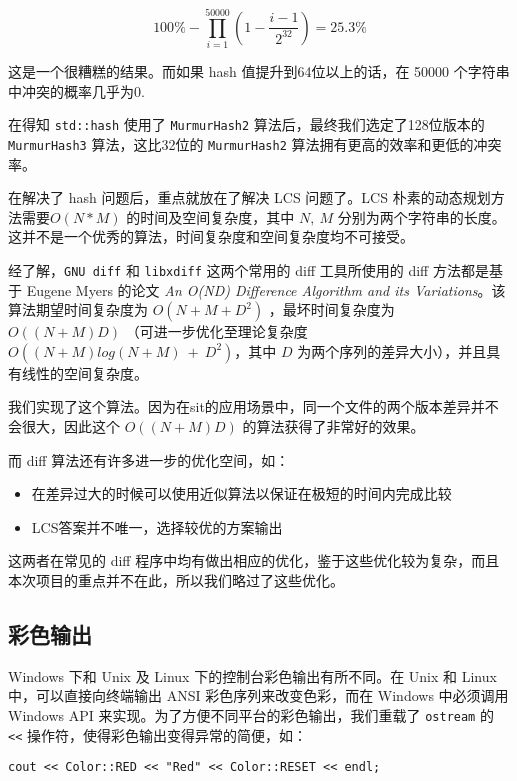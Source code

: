 \[
100\%-\prod _{i=1}^{50000} \left(1-\frac{i-1}{2^{32}}\right) = 25.3 \%
\]

这是一个很糟糕的结果。而如果 hash 值提升到64位以上的话，在 50000
个字符串中冲突的概率几乎为0.

在得知 \texttt{std::hash} 使用了 \texttt{MurmurHash2}
算法后，最终我们选定了128位版本的 \texttt{MurmurHash3} 算法，这比32位的
\texttt{MurmurHash2} 算法拥有更高的效率和更低的冲突率。

在解决了 hash 问题后，重点就放在了解决 LCS 问题了。LCS
朴素的动态规划方法需要$O(N*M)$ 的时间及空间复杂度，其中
$N,\ M$
分别为两个字符串的长度。这并不是一个优秀的算法，时间复杂度和空间复杂度均不可接受。

经了解，\texttt{GNU\ diff} 和 \texttt{libxdiff} 这两个常用的 diff
工具所使用的 diff 方法都是基于 Eugene Myers 的论文 \emph{An O(ND)
Difference Algorithm and its Variations}。该算法期望时间复杂度为
$O(N+M+D^2)$ ，最坏时间复杂度为 $O((N+M)D)$
（可进一步优化至理论复杂度 $O((N+M)log(N+M)\ +\ D^2)$，其中
$D$ 为两个序列的差异大小），并且具有线性的空间复杂度。

我们实现了这个算法。因为在sit的应用场景中，同一个文件的两个版本差异并不会很大，因此这个
$O((N+M)D)$ 的算法获得了非常好的效果。

而 diff 算法还有许多进一步的优化空间，如：

\begin{itemize}
\item
  在差异过大的时候可以使用近似算法以保证在极短的时间内完成比较
\item
  LCS答案并不唯一，选择较优的方案输出
\end{itemize}

这两者在常见的 diff
程序中均有做出相应的优化，鉴于这些优化较为复杂，而且本次项目的重点并不在此，所以我们略过了这些优化。

\subsection{彩色输出}

Windows 下和 Unix 及 Linux 下的控制台彩色输出有所不同。在 Unix 和 Linux
中，可以直接向终端输出 ANSI 彩色序列来改变色彩，而在 Windows 中必须调用
Windows API 来实现。为了方便不同平台的彩色输出，我们重载了
\texttt{ostream} 的 \texttt{\textless{}\textless{}}
操作符，使得彩色输出变得异常的简便，如：

\begin{lstlisting}
cout << Color::RED << "Red" << Color::RESET << endl;
\end{lstlisting}
